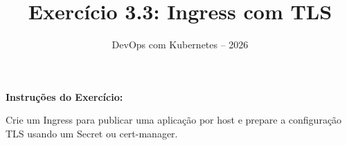 \documentclass[11pt,a4paper]{article}
\title{\color{secondary}\Huge\textbf{Exercício 3.3: Ingress com TLS}}
\author{\color{primary}DevOps com Kubernetes -- 2026}
\date{}
\begin{document}
\maketitle


\textbf{Instruções do Exercício:}

\begin{tcolorbox}[colback=blue!5!white,colframe=blue!75!black]
Crie um Ingress para publicar uma aplicação por host e prepare a configuração TLS usando um Secret ou cert-manager.
\end{tcolorbox}
\end{document}
